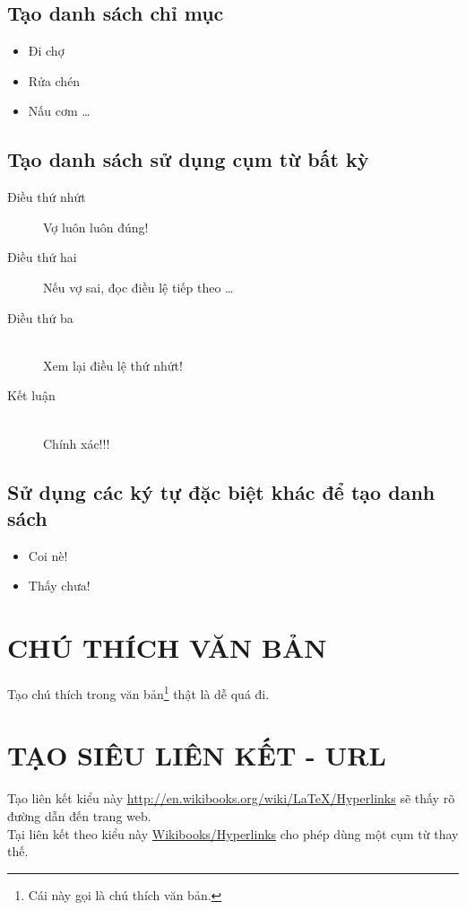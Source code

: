 \documentclass{article}
\begin{document}
\subsection{Tạo danh sách chỉ mục}
\begin{itemize}
	\item Đi chợ
	\item Rửa chén
	\item Nấu cơm \ldots \\
\end{itemize}

\subsection{Tạo danh sách sử dụng cụm từ bất kỳ}
\begin{description}
	\item[Điều thứ nhứt] 
	Vợ luôn luôn đúng!
	\item[Điều thứ hai] Nếu vợ sai, đọc điều lệ tiếp theo \ldots
	\item[Điều thứ ba] \hfill \\Xem lại điều lệ thứ nhứt!
	\item[Kết luận] \hfill\\ Chính xác!!!
\end{description}

\subsection{Sử dụng các ký tự đặc biệt khác để tạo danh sách}
\renewcommand{\labelitemi}{\ding{170}}
\begin{itemize}
	\item Coi nè!
	\item Thấy chưa!
\end{itemize}

\section{CHÚ THÍCH VĂN BẢN}
Tạo chú thích trong văn bản\footnote{Cái này gọi là chú thích văn bản.} thật là dễ quá đi.

\section{TẠO SIÊU LIÊN KẾT - URL}
Tạo liên kết kiểu này \url{http://en.wikibooks.org/wiki/LaTeX/Hyperlinks} sẽ thấy rõ đường dẫn đến trang web.\\
Tại liên kết theo kiểu này \href{http://en.wikibooks.org/wiki/LaTeX/Hyperlinks}{Wikibooks/Hyperlinks} cho phép dùng một cụm từ thay thế.
\end{document}
